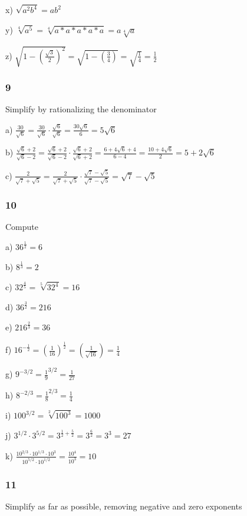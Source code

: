 \documentclass[]{report}
\begin{document}
x) $\sqrt{a^2b^4} = ab^2$

y) $\sqrt[4]{a^5} = \sqrt[4]{a * a * a * a * a} = a \sqrt[4]{a}$

z) $\sqrt{1 - (\frac{\sqrt{3}}{2})^2} = \sqrt{1 - (\frac{3}{4})} = \sqrt{\frac{1}{4}}  = \frac{1}{2}$

\subsubsection{9}
Simplify by rationalizing the denominator


a) $\frac{30}{\sqrt{6}} = \frac{30}{\sqrt{6}} \cdot \frac{\sqrt{6}}{\sqrt{6}} = \frac{30\sqrt{6}}{6} = 5\sqrt{6}$

b) $\frac{\sqrt{6} + 2}{\sqrt{6} - 2} = \frac{\sqrt{6} + 2}{\sqrt{6} - 2} \cdot \frac{\sqrt{6} + 2}{\sqrt{6} + 2} = \frac{6 + 4\sqrt{6} + 4}{6 - 4} = \frac{10 + 4\sqrt{6}}{2} = 5 + 2\sqrt{6}$


c) $\frac{2}{\sqrt{7} + \sqrt{5}} = \frac{2}{\sqrt{7} + \sqrt{5}} \cdot  \frac{\sqrt{7} - \sqrt{5}}{\sqrt{7} - \sqrt{5}} = \sqrt{7} - \sqrt{5}$
	
\subsubsection{10}
Compute

a) $36^{\frac{1}{2}} = 6$

b) $8^{\frac{1}{3}} = 2$

c) $32^{\frac{4}{5}} = \sqrt[5]{32^4} = 16$

d) $36^{\frac{3}{2}} = 216$	

e) $216^{\frac{2}{3}} = 36$

f) $16^{-\frac{1}{2}} = (\frac{1}{16})^{\frac{1}{2}} = (\frac{1}{\sqrt{16}}) = \frac{1}{4}$

g) $ 9^{-3/2} = \frac{1}{9}^{3/2} = \frac{1}{27}$

h) $8^{-2/3} = \frac{1}{8}^{2/3} = \frac{1}{4}$

i) $ 100^{3/2} = \sqrt[2]{100^3} = 1000$

j) $3^{1/2} \cdot 3^{5/2} = 3^{\frac{1}{2} + \frac{5}{2}} = 3^{\frac{6}{2}} = 3^3 = 27$

k) $\frac{10^{2/3} \cdot 10^{1/3} \cdot 10^3}{10^{5/2} \cdot 10^{1/2}} = \frac{10^4}{10^3} = 10$

\subsubsection{11}
Simplify as far as possible, removing negative and zero exponents
\end{document}
